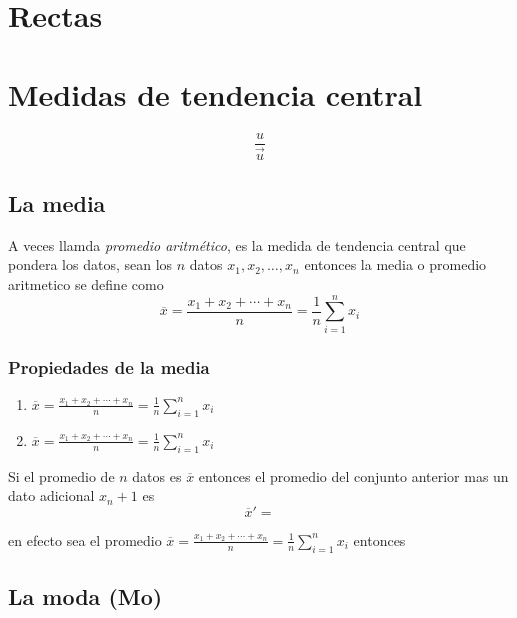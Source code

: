 \documentclass[10pt,]{krantz}
\providecommand{\tightlist}{%
  \setlength{\itemsep}{0pt}\setlength{\parskip}{0pt}}
\theoremstyle{definition}
\theoremstyle{definition}
\theoremstyle{definition}
\theoremstyle{remark}
\let\BeginKnitrBlock\begin \let\EndKnitrBlock\end
\begin{document}
\hypertarget{intro}{%
\chapter{Rectas}\label{intro}}

\hypertarget{medidas-de-tendencia-central}{%
\chapter{Medidas de tendencia central}\label{medidas-de-tendencia-central}}

\[\frac{u}{\vec{u}}\]

\hypertarget{la-media}{%
\section{La media}\label{la-media}}

A veces llamda \emph{promedio aritmético}, es la medida de tendencia central que pondera los datos, sean los \(n\) datos \(x_1, x_2,\ldots, x_n\) entonces la media o promedio aritmetico se define como \[\overline{x}=\frac{x_1+x_2+\cdots+x_n}{n}=\frac{1}{n}\sum_{i=1}^nx_i\]

\hypertarget{propiedades-de-la-media}{%
\subsection{Propiedades de la media}\label{propiedades-de-la-media}}

\begin{enumerate}
\def\labelenumi{\arabic{enumi}.}
\tightlist
\item
  \(\overline{x}=\frac{x_1+x_2+\cdots+x_n}{n}=\frac{1}{n}\sum_{i=1}^nx_i\)
\item
  \(\overline{x}=\frac{x_1+x_2+\cdots+x_n}{n}=\frac{1}{n}\sum_{i=1}^nx_i\)
\end{enumerate}

\BeginKnitrBlock{exercise}
\protect\hypertarget{exr:unnamed-chunk-1}{}{\label{exr:unnamed-chunk-1} }Si el promedio de \(n\) datos es \(\overline{x}\) entonces el promedio del conjunto anterior mas un dato adicional \(x_n+1\) es \[\overline{x}'=\]
\EndKnitrBlock{exercise}

\BeginKnitrBlock{solution}
\iffalse{} {Solución. } \fi{}en efecto sea el promedio \(\overline{x}=\frac{x_1+x_2+\cdots+x_n}{n}=\frac{1}{n}\sum_{i=1}^nx_i\) entonces
\EndKnitrBlock{solution}

\hypertarget{la-moda-mo}{%
\section{La moda (Mo)}\label{la-moda-mo}}
\end{document}
